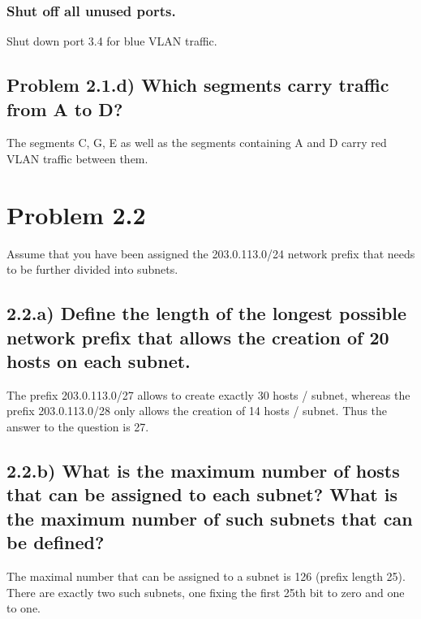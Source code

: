 \documentclass[a4paper,10pt]{article}
\begin{document}
\subsubsection{Shut off all unused ports. }
Shut down port 3.4 for blue VLAN traffic.
\subsection{Problem 2.1.d) Which segments carry traffic from A to D?}
The segments C, G, E as well as the segments containing A and D carry red VLAN traffic between them.

\section{Problem 2.2}
Assume that you have been assigned the 203.0.113.0/24 network prefix that needs to be further
divided into subnets.
\subsection{2.2.a) Define the length of the longest possible network prefix that allows the creation of 20 hosts on each subnet.}
The prefix 203.0.113.0/27 allows to create exactly 30 hosts / subnet, whereas the prefix 203.0.113.0/28 only allows the creation of 14 hosts / subnet. Thus the answer to the question is 27.
\subsection{2.2.b) What is the maximum number of hosts that can be assigned to each subnet? What is the maximum number of such subnets that can be defined?}
The maximal number that can be assigned to a subnet is 126 (prefix length 25). There are exactly two such subnets, one fixing the first 25th bit to zero and one to one.
\end{document}
